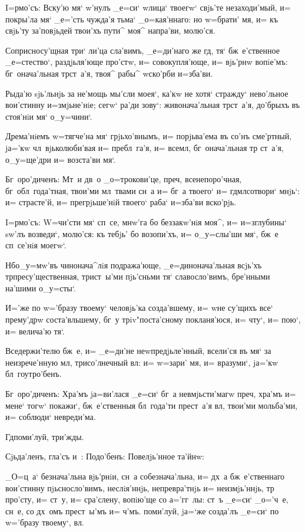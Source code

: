 
I=рмо'съ: Вску'ю мя` w'нулъ _е=си` w\т лица` 
твоегw` свjь'те незаходи'мый, и= покры'ла мя` _е='сть 
чужда'я тьма` _о=кая'ннаго: но w=брати' мя, и= къ свjь'ту 
за'повjьдей твои'хъ пути^ моя^ напра'ви, молю'ся.

Соприсносу'щная три` ли'ца сла'вимъ, _е=ди'наго же 
гд, тя` бж~е'ственное _е=стество`, раздjьля'юще 
про'стw, и= совокупля'юще, и= вjь'рнw вопiе'мъ: 
бг~онача'льная тр ст~а'я, твоя^ рабы^ w\т ско'рби 
и=зба'ви.

Рыда'ю sjь'льнjь за не'мощь мы'сли моея`, ка'кw не 
хотя` стражду` нево'льное вои'стинну и=змjьне'нiе; сегw` 
ра'ди зову`: живонача'льная тр ст~а'я, до'брыхъ въ 
стоя'нiи мя` о_у=чини`.

Дрема'нiемъ w=тягче'на мя` грjьхо'внымъ, и= 
порjьва'ема въ со'нъ сме'ртный, jа='кw чл~вjьколюби'вая 
и= пребл~га'я, и= всемл, бг~онача'льная тр 
ст~а'я, о_у=ще'дри и= возста'ви мя`.

Бг~оро'диченъ: Мт~и дв~о _о=трокови'це, преч, 
всенепоро'чная, бг~обл~года'тная, твои'ми мл~твами сн~а 
и= бг~а твоего` и= гд мл сотвори` мнjь`: и= 
страсте'й, и= прегрjьше'нiй твоего` раба` и=зба'ви 
вско'рjь.


I=рмо'съ: W=чи'сти мя` сп~се, мнw'га бо беззакw'нiя 
моя^, и= и=з\ъ глубины` sw'лъ возведи`, молю'ся: къ 
тебjь' бо возопи'хъ, и= о_у=слы'ши мя`, бж~е сп~се'нiя 
моегw`.

Нб о_у=мw'въ чинонача^лiя подража'юще, 
_е=динонача'льная всjь'хъ тр пресу'щественная, 
трист~ы'ми пjь'сньми тя` славосло'вимъ, бре'нными на'шими 
о_у=сты`.

И='же по w='бразу твоему` человjь'ка созда'вшему, и= 
w\т не су'щихъ все` прему'дрw соста'вльшему, бг~у 
трiv"поста'сному покланя'юся, и= чту`, и= пою`, и= 
велича'ю тя`.

Вседержи'телю бж~е, и= _е=ди'не неwпредjьле'нный, 
всели'ся въ мя` за неизрече'нную мл, трисо'лнечный 
вл: и= w=зари' мя, и= вразуми`, jа='кw 
бл~гоутро'бенъ.

Бг~оро'диченъ: Хра'мъ jа=ви'лася _е=си` бг~а 
невмjьсти'магw преч, хра'мъ и= мене` тогw` покажи`, 
бж~е'ственныя бл~года'ти прест~а'я вл, твои'ми 
мольба'ми, и= соблюди` невреди'ма.

Гд поми'луй, три'жды.

Сjьда'ленъ, гла'съ и~: Подо'бенъ: Повелjь'нное та'йнw:

_О=ц~а` безнача'льна вjь'рнiи, сн~а собезнача'льна, и= 
дх~а бж~е'ственнаго вои'стинну пjьсносло'вимъ, 
неслiя'ннjь, непревра'тнjь и= неизмjь'ннjь, тр 
про'сту, и= ст~у, и= сра'слену, вопiю'ще со а='гг~лы: 
ст~ъ _е=си` _о='ч~е, сн~е, со дх~омъ прест~ы'мъ и= 
ч'мъ. поми'луй, jа=`же созда'лъ _е=си` по w='бразу 
твоему`, вл.

